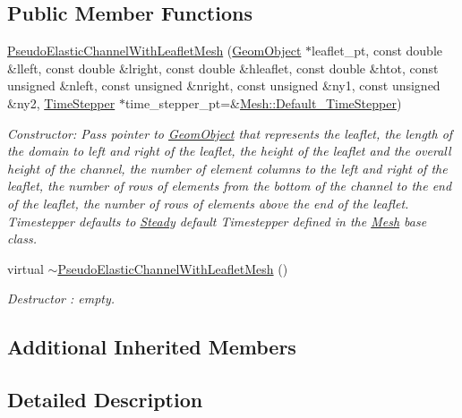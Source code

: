 \subsection*{Public Member Functions}
\begin{DoxyCompactItemize}
\item 
\hyperlink{classoomph_1_1PseudoElasticChannelWithLeafletMesh_a240a700ff3e934607b29d4ad14c6d70e}{Pseudo\+Elastic\+Channel\+With\+Leaflet\+Mesh} (\hyperlink{classoomph_1_1GeomObject}{Geom\+Object} $\ast$leaflet\+\_\+pt, const double \&lleft, const double \&lright, const double \&hleaflet, const double \&htot, const unsigned \&nleft, const unsigned \&nright, const unsigned \&ny1, const unsigned \&ny2, \hyperlink{classoomph_1_1TimeStepper}{Time\+Stepper} $\ast$time\+\_\+stepper\+\_\+pt=\&\hyperlink{classoomph_1_1Mesh_a12243d0fee2b1fcee729ee5a4777ea10}{Mesh\+::\+Default\+\_\+\+Time\+Stepper})
\begin{DoxyCompactList}\small\item\em Constructor\+: Pass pointer to \hyperlink{classoomph_1_1GeomObject}{Geom\+Object} that represents the leaflet, the length of the domain to left and right of the leaflet, the height of the leaflet and the overall height of the channel, the number of element columns to the left and right of the leaflet, the number of rows of elements from the bottom of the channel to the end of the leaflet, the number of rows of elements above the end of the leaflet. Timestepper defaults to \hyperlink{classoomph_1_1Steady}{Steady} default Timestepper defined in the \hyperlink{classoomph_1_1Mesh}{Mesh} base class. \end{DoxyCompactList}\item 
virtual \hyperlink{classoomph_1_1PseudoElasticChannelWithLeafletMesh_aaf0a9484052254d5840b4cde85a10a75}{$\sim$\+Pseudo\+Elastic\+Channel\+With\+Leaflet\+Mesh} ()
\begin{DoxyCompactList}\small\item\em Destructor \+: empty. \end{DoxyCompactList}\end{DoxyCompactItemize}
\subsection*{Additional Inherited Members}


\subsection{Detailed Description}
